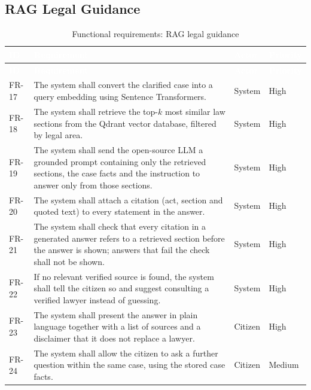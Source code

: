 \documentclass[12pt,a4paper]{report}
\newcommand{\thd}[1]{\textcolor{white}{\textbf{#1}}}
\newcommand{\headrow}{\rowcolor{tablehead}}
\newcommand{\fr}[4]{#1 & #2 & #3 & #4 \\ \hline}
\newcommand{\frhead}{\hline\headrow \thd{ID} & \thd{Requirement} & \thd{Actor} & \thd{Priority} \\ \hline}
\begin{document}
\subsection{RAG Legal Guidance}
\begin{longtable}{|p{1.4cm}|L{9.0cm}|L{2.0cm}|L{1.6cm}|}
\caption{Functional requirements: RAG legal guidance}\label{tab:fr-rag}\\
\frhead\endfirsthead \frhead\endhead
\fr{FR-17}{The system shall convert the clarified case into a query embedding using Sentence Transformers.}{System}{High}
\fr{FR-18}{The system shall retrieve the top-$k$ most similar law sections from the Qdrant vector database, filtered by legal area.}{System}{High}
\fr{FR-19}{The system shall send the open-source LLM a grounded prompt containing only the retrieved sections, the case facts and the instruction to answer only from those sections.}{System}{High}
\fr{FR-20}{The system shall attach a citation (act, section and quoted text) to every statement in the answer.}{System}{High}
\fr{FR-21}{The system shall check that every citation in a generated answer refers to a retrieved section before the answer is shown; answers that fail the check shall not be shown.}{System}{High}
\fr{FR-22}{If no relevant verified source is found, the system shall tell the citizen so and suggest consulting a verified lawyer instead of guessing.}{System}{High}
\fr{FR-23}{The system shall present the answer in plain language together with a list of sources and a disclaimer that it does not replace a lawyer.}{Citizen}{High}
\fr{FR-24}{The system shall allow the citizen to ask a further question within the same case, using the stored case facts.}{Citizen}{Medium}
\end{longtable}
\end{document}

